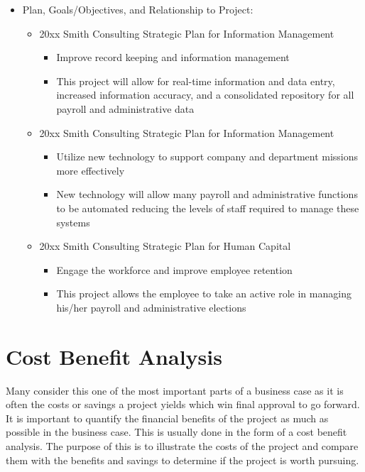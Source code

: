 \documentclass[11pt]{article}
\begin{document}
\begin{itemize}
\item Plan,	Goals/Objectives, and Relationship to Project:
\begin{itemize}
\item 20xx Smith Consulting Strategic Plan for Information Management
\begin{itemize}
\item Improve record keeping and information management
\item This project will allow for real-time information and data entry, increased information accuracy, and a consolidated repository for all payroll and administrative data
\end{itemize}
\item 20xx Smith Consulting Strategic Plan for Information Management
\begin{itemize}
\item Utilize new technology to support company and department missions more effectively
\item New technology will allow many payroll and administrative functions to be automated reducing the levels of staff required to manage these systems
\end{itemize}
\item 20xx Smith Consulting Strategic Plan for Human Capital
\begin{itemize}
\item Engage the workforce and improve employee retention
\item This project allows the employee to take an active role in managing his/her payroll and administrative elections
\end{itemize}
\end{itemize}
\end{itemize}

\section{Cost Benefit Analysis}
\label{sec:org59e99ff}
Many consider this one of the most important parts of a business case as it is often the costs or savings a project yields which win final approval to go forward. It is important to quantify the financial benefits of the project as much as possible in the business case. This is usually done in the form of a cost benefit analysis. The purpose of this is to illustrate the costs of the project and compare them with the benefits and savings to determine if the project is worth pursuing.
\end{document}
